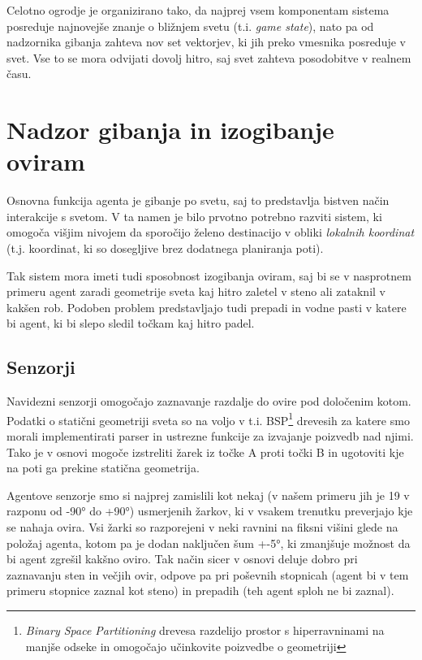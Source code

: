 \documentclass[a4paper,10pt]{article}
\begin{document}
Celotno ogrodje je organizirano tako, da najprej vsem komponentam sistema posreduje najnovejše znanje o bližnjem svetu (t.i. \textit{game state}), nato pa od nadzornika gibanja zahteva nov set vektorjev, ki jih preko vmesnika posreduje v svet. Vse to se mora odvijati dovolj hitro, saj svet zahteva posodobitve v realnem času.

\section{Nadzor gibanja in izogibanje oviram}

Osnovna funkcija agenta je gibanje po svetu, saj to predstavlja bistven način interakcije s svetom. V ta namen je bilo prvotno potrebno razviti sistem, ki omogoča višjim nivojem da sporočijo želeno destinacijo v obliki \textit{lokalnih koordinat} (t.j. koordinat, ki so dosegljive brez dodatnega planiranja poti).

Tak sistem mora imeti tudi sposobnost izogibanja oviram, saj bi se v nasprotnem primeru agent zaradi geometrije sveta kaj hitro zaletel v steno ali zataknil v kakšen rob. Podoben problem predstavljajo tudi prepadi in vodne pasti v katere bi agent, ki bi slepo sledil točkam kaj hitro padel.

\subsection{Senzorji}

Navidezni senzorji omogočajo zaznavanje razdalje do ovire pod določenim kotom. Podatki o statični geometriji sveta so na voljo v t.i. BSP\footnote{\textit{Binary Space Partitioning} drevesa razdelijo prostor s hiperravninami na manjše odseke in omogočajo učinkovite poizvedbe o geometriji} drevesih za katere smo morali implementirati parser in ustrezne funkcije za izvajanje poizvedb nad njimi. Tako je v osnovi mogoče izstreliti žarek iz točke A proti točki B in ugotoviti kje na poti ga prekine statična geometrija.

Agentove senzorje smo si najprej zamislili kot nekaj (v našem primeru jih je 19 v razponu od -90° do +90°) usmerjenih žarkov, ki v vsakem trenutku preverjajo kje se nahaja ovira. Vsi žarki so razporejeni v neki ravnini na fiksni višini glede na položaj agenta, kotom pa je dodan naključen šum +-5°, ki zmanjšuje možnost da bi agent zgrešil kakšno oviro. Tak način sicer v osnovi deluje dobro pri zaznavanju sten in večjih ovir, odpove pa pri poševnih stopnicah (agent bi v tem primeru stopnice zaznal kot steno) in prepadih (teh agent sploh ne bi zaznal).
\end{document}
